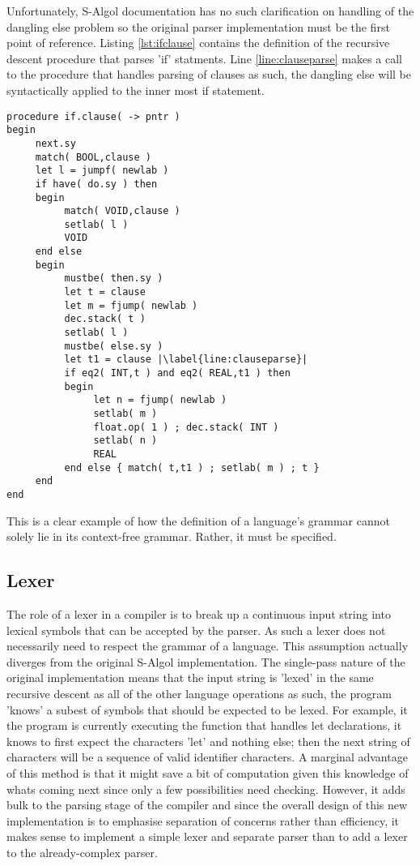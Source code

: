 \documentclass{article}
\begin{document}
Unfortunately, S-Algol documentation has no such clarification on handling of the dangling else problem so the original parser implementation must be the first point of reference. Listing \ref{lst:ifclause} contains the definition of the recursive descent procedure that parses 'if' statments. Line \ref{line:clauseparse} makes a call to the procedure that handles parsing of clauses as such, the dangling else will be syntactically applied to the inner most if statement.

\begin{lstlisting}[caption={S-Algol compiler implementation of parsing an 'if' statement},label={lst:ifclause}, escapechar="|"]
procedure if.clause( -> pntr )
begin
     next.sy
     match( BOOL,clause )
     let l = jumpf( newlab )
     if have( do.sy ) then
     begin
          match( VOID,clause )
          setlab( l )
          VOID
     end else
     begin
          mustbe( then.sy )
          let t = clause
          let m = fjump( newlab )
          dec.stack( t )
          setlab( l )
          mustbe( else.sy )
          let t1 = clause |\label{line:clauseparse}|
          if eq2( INT,t ) and eq2( REAL,t1 ) then
          begin
               let n = fjump( newlab )
               setlab( m )
               float.op( 1 ) ; dec.stack( INT )
               setlab( n )
               REAL
          end else { match( t,t1 ) ; setlab( m ) ; t }
     end
end
\end{lstlisting}

This is a clear example of how the definition of a language's grammar cannot solely lie in its context-free grammar. Rather, it must be specified.

\subsection{Lexer}

The role of a lexer in a compiler is to break up a continuous input string into lexical symbols that can be accepted by the parser. As such a lexer does not necessarily need to respect the grammar of a language. This assumption actually diverges from the original S-Algol implementation. The single-pass nature of the original implementation means that the input string is 'lexed' in the same recursive descent as all of the other language operations as such, the program 'knows' a subest of symbols that should be expected to be lexed. For example, it the program is currently executing the function that handles let declarations, it knows to first expect the characters 'let' and nothing else; then the next string of characters will be a sequence of valid identifier characters. A marginal advantage of this method is that it might save a bit of computation given this knowledge of whats coming next since only a few possibilities need checking. However, it adds bulk to the parsing stage of the compiler and since the overall design of this new implementation is to emphasise separation of concerns rather than efficiency, it makes sense to implement a simple lexer and separate parser than to add a lexer to the already-complex parser.
\end{document}
